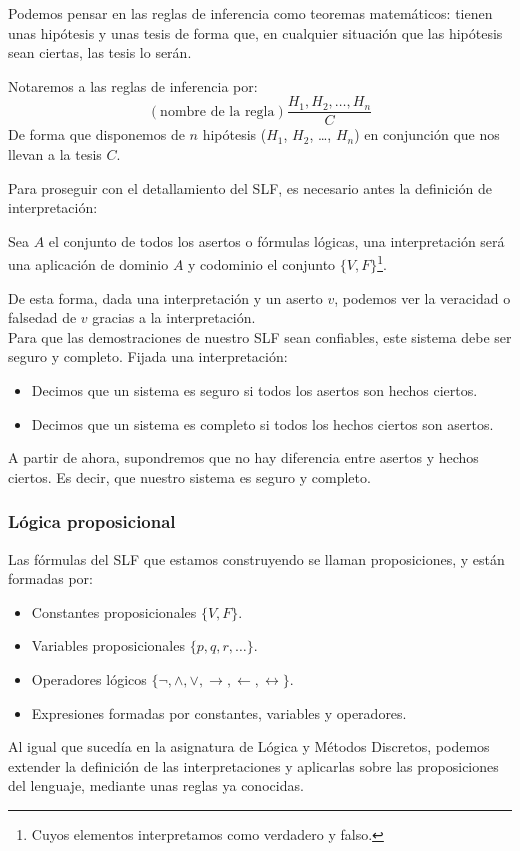 Podemos pensar en las reglas de inferencia como teoremas matemáticos: tienen unas hipótesis y unas tesis de forma que, en cualquier situación que las hipótesis sean ciertas, las tesis lo serán.

\begin{notacion}
    Notaremos a las reglas de inferencia por:
    \begin{equation*}
        (\text{nombre de la regla})\dfrac{H_1, H_2, \ldots, H_n}{C}
    \end{equation*}
    De forma que disponemos de $n$ hipótesis ($H_1$, $H_2$, \ldots, $H_n$) en conjunción que nos llevan a la tesis $C$.
\end{notacion}

Para proseguir con el detallamiento del SLF, es necesario antes la definición de interpretación:
\begin{definicion}[Interpretación]
    Sea $A$ el conjunto de todos los asertos o fórmulas lógicas, una interpretación será una aplicación de dominio $A$ y codominio el conjunto $\{V, F\}$\footnote{Cuyos elementos interpretamos como verdadero y falso.}.
\end{definicion}
De esta forma, dada una interpretación y un aserto $v$, podemos ver la veracidad o falsedad de $v$ gracias a la interpretación.\\

Para que las demostraciones de nuestro SLF sean confiables, este sistema debe ser seguro y completo. Fijada una interpretación:
\begin{itemize}
    \item Decimos que un sistema es seguro si todos los asertos son hechos ciertos.
    \item Decimos que un sistema es completo si todos los hechos ciertos son asertos.
\end{itemize}
A partir de ahora, supondremos que no hay diferencia entre asertos y hechos ciertos. Es decir, que nuestro sistema es seguro y completo.

\subsubsection{Lógica proposicional}
Las fórmulas del SLF que estamos construyendo se llaman proposiciones, y están formadas por:
\begin{itemize}
    \item Constantes proposicionales $\{V,F\}$.
    \item Variables proposicionales $\{p,q,r,\ldots\}$.
    \item Operadores lógicos $\{\lnot,\land,\lor,\rightarrow,\leftarrow, \longleftrightarrow \}$.
    \item Expresiones formadas por constantes, variables y operadores.
\end{itemize}
Al igual que sucedía en la asignatura de Lógica y Métodos Discretos, podemos extender la definición de las interpretaciones y aplicarlas sobre las proposiciones del lenguaje, mediante unas reglas ya conocidas.\\

